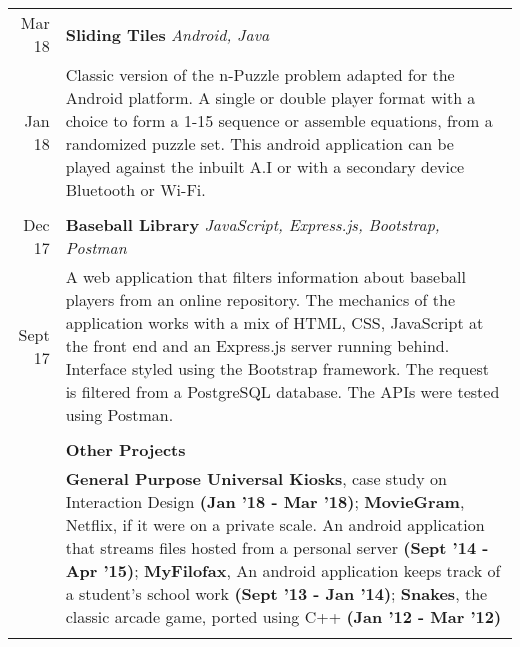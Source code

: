 \documentclass[article,10pt]{article}
\begin{document}
\begin{tabular}{r|p{17cm}}
Mar \textquotesingle{}18 & {\textbf{Sliding Tiles}} {\sl Android, Java}  \\
Jan \textquotesingle{}18 & \footnotesize{Classic version of the n-Puzzle problem adapted for the Android platform. A single or double player format with a choice to form a 1-15 sequence or assemble equations, from a randomized puzzle set. This android application can be played against the inbuilt A.I or with a secondary device Bluetooth or Wi-Fi.}\\ \multicolumn{2}{c}{} \\

Dec \textquotesingle{}17 & {\textbf{Baseball Library}} {\sl JavaScript, Express.js, Bootstrap, Postman}\\
Sept \textquotesingle{}17 & \footnotesize{A web application that filters information about baseball players from an online repository. The mechanics of the application works with a mix of HTML, CSS, JavaScript at the front end and an Express.js server running behind. Interface styled using the Bootstrap framework. The request is filtered from a PostgreSQL database. The API\textquotesingle{}s were tested using Postman.}\\ \multicolumn{2}{c}{}\\


&{\textbf{Other Projects}}\\
&\footnotesize{\textbf{General Purpose Universal Kiosks}, case study on Interaction Design \textbf{(Jan ’18 - Mar ’18)}; \textbf{MovieGram}, Netflix, if it were on a private scale. An android application that streams files hosted from a personal server \textbf{(Sept ’14 - Apr ’15)}; \textbf{MyFilofax}, An android application keeps track of a student’s school work \textbf{(Sept ’13 - Jan ’14)}; \textbf{Snakes}, the classic arcade game, ported using C++ \textbf{(Jan ’12 - Mar ’12)}}\\\multicolumn{2}{c}{}\\

\end{tabular}
\end{document}
